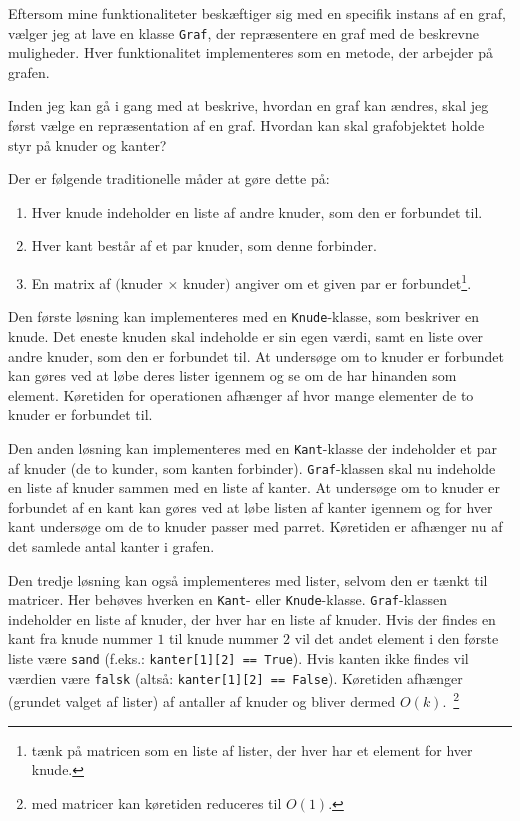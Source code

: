 \documentclass[10pt,a4paper,danish]{article}
\newcommand{\ct}{\texttt}
\begin{document}
Eftersom mine funktionaliteter beskæftiger sig med en specifik instans
af en graf, vælger jeg at lave en klasse \ct{Graf}, der
repræsentere en graf med de beskrevne muligheder. Hver funktionalitet
implementeres som en metode, der arbejder på grafen.

Inden jeg kan gå i gang med at beskrive, hvordan en graf kan ændres,
skal jeg først vælge en repræsentation af en graf. Hvordan kan skal
grafobjektet holde styr på knuder og kanter?

Der er følgende traditionelle måder at gøre dette på:
\begin{enumerate}
\item Hver knude indeholder en liste af andre knuder, som den er
  forbundet til.
\item Hver kant består af et par knuder, som denne forbinder.
\item En matrix af $($knuder $\times$ knuder$)$ angiver om et given
  par er forbundet\footnote{tænk på matricen som en liste af
    lister, der hver har et element for hver knude.}.
\end{enumerate}

Den første løsning kan implementeres med en \ct{Knude}-klasse, som
beskriver en knude. Det eneste knuden skal indeholde er sin egen
værdi, samt en liste over andre knuder, som den er forbundet til. At
undersøge om to knuder er forbundet kan gøres ved at løbe deres lister
igennem og se om de har hinanden som element. Køretiden for
operationen afhænger af hvor mange elementer de to knuder er forbundet
til.

Den anden løsning kan implementeres med en \ct{Kant}-klasse der
indeholder et par af knuder (de to kunder, som kanten
forbinder). \ct{Graf}-klassen skal nu indeholde en liste af knuder
sammen med en liste af kanter. At undersøge om to knuder er forbundet
af en kant kan gøres ved at løbe listen af kanter igennem og for hver
kant undersøge om de to knuder passer med parret. Køretiden er
afhænger nu af det samlede antal kanter i grafen.

Den tredje løsning kan også implementeres med lister, selvom den er
tænkt til matricer. Her behøves hverken en \ct{Kant}- eller
\ct{Knude}-klasse. \ct{Graf}-klassen indeholder en liste af knuder,
der hver har en liste af knuder. Hvis der findes en kant fra knude
nummer $1$ til knude nummer $2$ vil det andet element i den første
liste være \ct{sand} (f.eks.: \ct{kanter[1][2] == True}). Hvis kanten
ikke findes vil værdien være \ct{falsk} (altså: \ct{kanter[1][2] ==
  False}). Køretiden afhænger (grundet valget af lister) af antaller
af knuder og bliver dermed $O(k)$.\ \footnote{med matricer kan
  køretiden reduceres til $O(1)$.}\\
\end{document}

